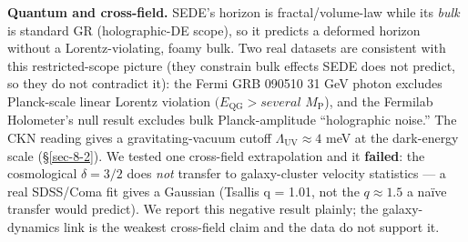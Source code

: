 \documentclass[preprint,12pt]{elsarticle}
\begin{document}
\textbf{Quantum and cross-field.} SEDE's horizon is fractal/volume-law
while its \emph{bulk} is standard GR (holographic-DE scope), so it
predicts a deformed horizon without a Lorentz-violating, foamy bulk. Two
real datasets are consistent with this restricted-scope picture (they
constrain bulk effects SEDE does not predict, so they do not contradict
it): the Fermi GRB 090510 31 GeV photon excludes Planck-scale linear
Lorentz violation \((E_\mathrm{QG} > several\) \(M_{\mathrm{P}}\)), and
the Fermilab Holometer's null result excludes bulk Planck-amplitude
``holographic noise.'' The CKN reading gives a gravitating-vacuum cutoff
\(\Lambda _\mathrm{UV} \approx  4\) meV at the dark-energy scale
(§\ref{sec-8-2}). We tested one cross-field extrapolation and it
\textbf{failed}: the cosmological \(\delta  = 3/2\) does \emph{not}
transfer to galaxy-cluster velocity statistics --- a real SDSS/Coma fit
gives a Gaussian (Tsallis q = 1.01, not the \(q \approx  1.5\) a naïve
transfer would predict). We report this negative result plainly; the
galaxy-dynamics link is the weakest cross-field claim and the data do
not support it.
\end{document}

